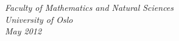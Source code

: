 \documentclass[a4paper]{article}
\begin{document}
\begin{center}
  \vspace{3mm}
  \textsl{Faculty of Mathematics and Natural Sciences} \\
  \textsl{University of Oslo} \\
  \vspace{2mm}
  \large
  \textsl{May 2012} \\
  \normalsize
\end{center}
\end{document}
